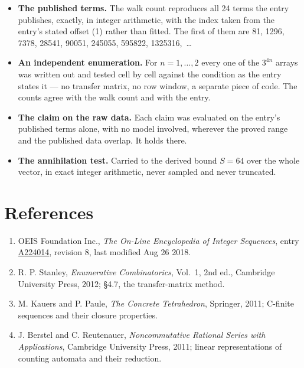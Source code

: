 \documentclass[11pt]{article}
\theoremstyle{definition}
\begin{document}
\begin{itemize}

\item {\bfseries The published terms.} The walk count reproduces all 24 terms the entry publishes, exactly, in integer arithmetic, with the index taken from the entry's stated offset (1) rather than fitted. The first of them are 81, 1296, 7378, 28541, 90051, 245055, 595822, 1325316,~\dots

\item {\bfseries An independent enumeration.} For $n = 1,\dots,2$ every one of the $3^{4n}$ arrays was written out and tested cell by cell against the condition as the entry states it --- no transfer matrix, no row window, a separate piece of code. The counts agree with the walk count and with the entry.

\item {\bfseries The claim on the raw data.} Each claim was evaluated on the entry's published terms alone, with no model involved, wherever the proved range and the published data overlap. It holds there.

\item {\bfseries The annihilation test.} Carried to the derived bound $S = 64$ over the whole vector, in exact integer arithmetic, never sampled and never truncated.

\end{itemize}

\section{References}

\begin{enumerate}

\item OEIS Foundation Inc., \emph{The On-Line Encyclopedia of Integer Sequences}, entry \href{https://oeis.org/A224014}{A224014}, revision 8, last modified Aug 26 2018.

\item R. P. Stanley, \emph{Enumerative Combinatorics}, Vol.~1, 2nd ed., Cambridge University Press, 2012; \S4.7, the transfer-matrix method.

\item M. Kauers and P. Paule, \emph{The Concrete Tetrahedron}, Springer, 2011; C-finite sequences and their closure properties.

\item J. Berstel and C. Reutenauer, \emph{Noncommutative Rational Series with Applications}, Cambridge University Press, 2011; linear representations of counting automata and their reduction.

\end{enumerate}
\end{document}
